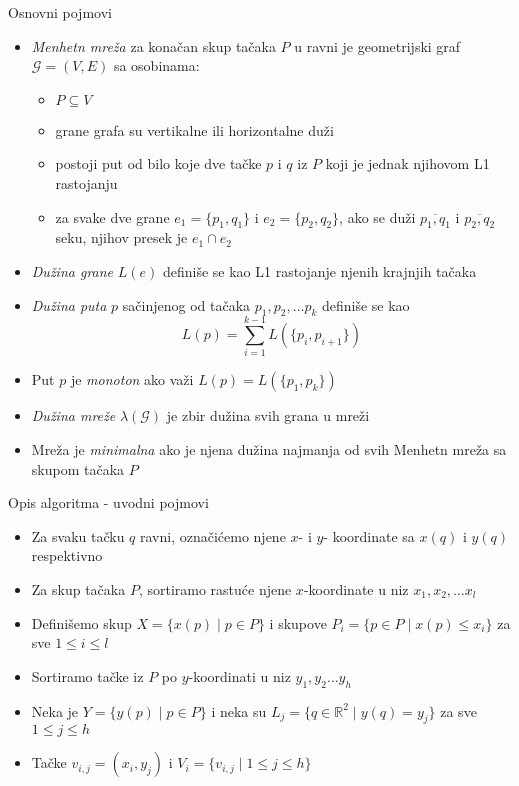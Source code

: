 \documentclass[10pt]{beamer}
\begin{document}
\begin{frame}{Osnovni pojmovi}
\begin{itemize}
        \item \textit{Menhetn mreža} za konačan skup tačaka $P$ u ravni je geometrijski graf $\mathcal{G} = (V, E)$ sa osobinama:
    \begin{itemize}
        \item $P \subseteq V$
        \item grane grafa su vertikalne ili horizontalne duži
        \item postoji put od bilo koje dve tačke $p$ i $q$ iz $P$ koji je jednak njihovom L1 rastojanju
        \item za svake dve grane $e_1 = \{p_1, q_1\}$ i $e_2 = \{p_2, q_2\}$, ako se duži $\overline{p_1, q_1}$ i $\overline{p_2, q_2}$ seku, njihov presek je $e_1 \cap e_2$
    \end{itemize}
    \item \textit{Dužina grane} $L(e)$ definiše se kao L1 rastojanje njenih krajnjih tačaka
    \item \textit{Dužina puta} $p$ sačinjenog od tačaka $p_1, p_2, \dots p_k$ definiše se kao \[ L(p) = \sum_{i = 1}^{k-1} L(\{p_i, p_{i+1}\}) \]
    \item Put $p$ je \textit{monoton} ako važi $L(p) = L(\{p_1, p_k\})$
    \item \textit{Dužina mreže} $\lambda(\mathcal{G})$ je zbir dužina svih grana u mreži
    \item Mreža je \textit{minimalna} ako je njena dužina najmanja od svih Menhetn mreža sa skupom tačaka $P$
\end{itemize}
\end{frame}

\begin{frame}{Opis algoritma - uvodni pojmovi}
\begin{itemize}
    \item Za svaku tačku $q$ ravni, označićemo njene $x$- i $y$- koordinate sa $x(q)$ i $y(q)$ respektivno
    \item Za skup tačaka $P$, sortiramo rastuće njene $x$-koordinate u niz $x_1, x_2, \dots x_l$
    \item Definišemo skup $X = \{ x(p) \mid p \in P \}$ i skupove $P_i = \{ p \in P \mid x(p) \leq x_i \}$ za sve $1 \leq i \leq l$
    \item Sortiramo tačke iz $P$ po $y$-koordinati u niz $y_1, y_2 \dots y_h$
    \item Neka je $Y = \{ y(p) \mid p \in P \}$ i neka su $L_j = \{ q \in \mathbb{R}^2 \mid y(q) = y_j \}$ za sve $1 \leq j \leq h$
    \item Tačke $v_{i, j} = (x_i, y_j)$ i $V_i = \{ v_{i, j} \mid 1 \leq j \leq h \}$
\end{itemize}
\end{frame}
\end{document}
